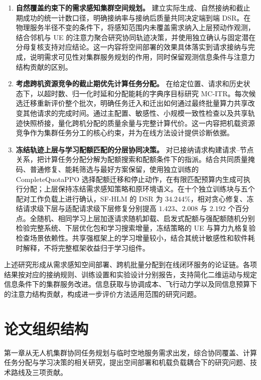 \begin{enumerate}
    \item \textbf{自然覆盖约束下的需求感知集群空间规划。} 建立实际生成、自然接纳和截止期成功的统一计数口径，明确接纳率与接纳后质量共同决定端到端 DSR。在物理服务半径不变的条件下，将感知范围内未覆盖需求纳入上层预动作观测，结合邻机与 UE 的注意力聚合研究协同轨迹决策，并使用独立确认与固定潜在分母复核支持对应结论。这一内容将空间部署的效果具体落实到请求接纳与完成，说明需求可见性对集群服务规划的作用，同时保留观测信息条件与注意力结构贡献的区别。
    \item \textbf{考虑跨机资源竞争的截止期优先计算任务分配。} 在给定位置、请求和历史状态下，以超时数、归一化时延和分配能耗的字典序目标研究 MC-ITR。每次候选迁移重新评价整个批次，明确任务迁入和迁出如何通过最终批量算力共享改变其他请求的完成时间。通过主配置、敏感性、小规模一致性检查以及共享轨迹快照桥接，量化跨机分配的质量余量与完整计算代价。这一内容把机载资源竞争作为集群任务分工的核心约束，并为在线方法设计提供诊断依据。
    \item \textbf{冻结轨迹上层与学习配额匹配的分层协同决策。} 对已接纳请求构建请求--节点关系，把计算任务分配分解为配额搜索和配额条件下的指派。结合共同质量掩码、普通修复、能耗筛选与最好方案保留，使用独立训练的 CompleteQuotaPPO 选择配额迁移和停止动作，在有限匹配预算内生成可执行分配；上层保持冻结需求感知策略和原环境语义。在十个独立训练块与五个配对工作负载上进行确认，SF-HLM 的 DSR 为 $34.244\%$，相对贪心修复、冻结请求级下层与适配请求级下层修复分别提高 $1.423$、$2.008$ 与 $2.192$ 个百分点。全随机、相同学习上层加逐请求随机卸载、启发式配额与强配额随机分别检验完整系统、下层优化包和学习搜索增量，冻结策略的 UE 与算力九格复验检查场景依赖性。共享强框架上的学习增量较小，结合其统计敏感性和软件耗时解释，不将完整框架收益归于学习组件。
\end{enumerate}

上述研究形成从需求感知空间部署、跨机批量分配到在线闭环服务的论证链。各项结果按对应的接纳规则、训练设置和实验设计分别报告，支持简化二维运动与规定信息条件下的集群服务改进。信息获取与协调成本、飞行动力学以及同信息预算下的注意力结构贡献，构成进一步评价方法适用范围的研究问题。

\section{论文组织结构}
\label{sec:arrangement}

第一章从无人机集群协同任务规划与临时空地服务需求出发，综合协同覆盖、计算任务分配与学习决策的相关研究，提出空间部署和机载负载耦合下的研究问题、技术路线及三项贡献。

